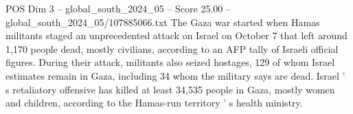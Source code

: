 \begin{textsample}{POS Dim 3 – global\_south\_2024\_05 – Score 25.00 – global\_south\_2024\_05/107885066.txt}
The Gaza war started when Hamas militants staged an unprecedented attack on Israel on October 7 that left around 1,170 people dead, mostly civilians, according to an AFP tally of Israeli official figures.
During their attack, militants also seized hostages, 129 of whom Israel estimates remain in Gaza, including 34 whom the military says are dead.
Israel ' s retaliatory offensive has killed at least 34,535 people in Gaza, mostly women and children, according to the Hamas-run territory ' s health ministry.

\end{textsample}
